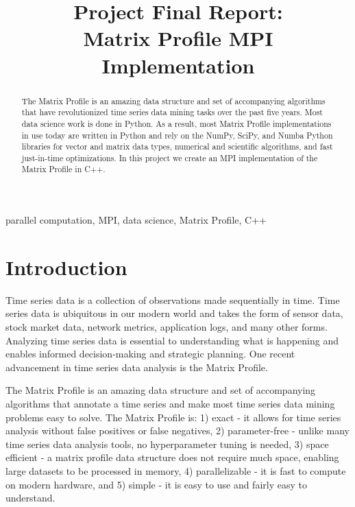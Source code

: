 \documentclass[conference]{IEEEtran}
\begin{document}
\title{Project Final Report:\\Matrix Profile MPI Implementation}

\author{
}


\maketitle
\begin{abstract}
The Matrix Profile is an amazing data structure and set of accompanying algorithms that have revolutionized time series data mining tasks over the past five years.  Most data science work is done in Python.  As a result, most Matrix Profile implementations in use today are written in Python and rely on the NumPy, SciPy, and Numba Python libraries for vector and matrix data types, numerical and scientific algorithms, and fast just-in-time optimizations.  In this project we create an MPI implementation of the Matrix Profile in C++.
\end{abstract}

\begin{IEEEkeywords}
parallel computation, MPI, data science, Matrix Profile, C++
\end{IEEEkeywords}


\section{Introduction}
Time series data is a collection of observations made sequentially in time.  Time series data is ubiquitous in our modern world and takes the form of sensor data, stock market data, network metrics, application logs, and many other forms.  Analyzing time series data is essential to understanding what is happening and enables informed decision-making and strategic planning.  One recent advancement in time series data analysis is the Matrix Profile\cite{MatrixProfile1}. 

The Matrix Profile is an amazing data structure and set of accompanying algorithms that annotate a time series and make most time series data mining problems easy to solve\cite{MatrixProfile2}. The Matrix Profile is:  1) exact - it allows for time series analysis without false positives or false negatives, 2) parameter-free - unlike many time series data analysis tools, no hyperparameter tuning is needed, 3) space efficient - a matrix profile data structure does not require much space, enabling large datasets to be processed in memory, 4) parallelizable - it is fast to compute on modern hardware, and 5) simple - it is easy to use and fairly easy to understand\cite{Keogh}.   
\end{document}
